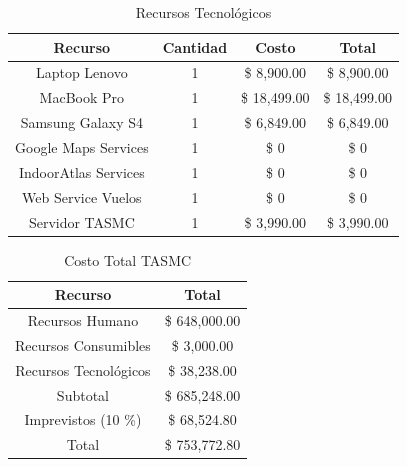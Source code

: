 \begin{table}[h] 
	\begin{center}
		\begin{tabular}{|c|c|c|c|}
			\hline \rowcolor[RGB]{51,153,255} 
			\textcolor{blanco}{\bf Recurso} &
				\textcolor{blanco}{\bf Cantidad} &
				\textcolor{blanco}{\bf Costo} &
				\textcolor{blanco}{\bf Total} \\
			\hline 
				Laptop Lenovo &
				1 &
				\$ 8,900.00 &
				\$ 8,900.00  \\
      		\hline \rowcolor[RGB]{240,248,255}
      			MacBook Pro &
				1 &
				\$ 18,499.00&
				\$ 18,499.00 \\
			\hline 
				Samsung Galaxy S4 &
				1 &
				\$ 6,849.00 &
				\$ 6,849.00  \\
      		\hline \rowcolor[RGB]{240,248,255}
      			Google Maps Services &
				1 &
				\$ 0 &
				\$ 0 \\
			\hline
				IndoorAtlas Services &
				1 &
				\$ 0 &
				\$ 0 \\
      		\hline \rowcolor[RGB]{240,248,255}
      			Web Service Vuelos &
				1 &
				\$ 0 &
				\$ 0 \\
			\hline
				Servidor TASMC &
				1 &
				\$ 3,990.00 &
				\$ 3,990.00 \\	
      		\hline 
    		\end{tabular}
	\end{center}
	\caption[Recursos Tecnológicos]{Recursos Tecnológicos} 
	\label{tab:recursosTecnologicos}
\end{table}

\begin{table} 
	\begin{center}
		\begin{tabular}{|c|c|}
			\hline \rowcolor[RGB]{51,153,255} 
			\textcolor{blanco}{\bf Recurso} &
				\textcolor{blanco}{\bf Total} \\
			\hline 
				Recursos Humano &
				\$ 648,000.00  \\
      		\hline \rowcolor[RGB]{240,248,255}
      			Recursos Consumibles &
				\$ 3,000.00  \\
			\hline 
				Recursos Tecnológicos &
				\$ 38,238.00  \\
      		\hline \rowcolor[RGB]{240,248,255}
      			Subtotal &
				\$ 685,248.00  \\
			\hline  
				Imprevistos (10 \%) &
				\$ 68,524.80  \\
      		\hline \rowcolor[RGB]{240,248,255}
      			Total &
				\$ 753,772.80 \\
      		\hline 
    		\end{tabular}
	\end{center}
	\caption[Costo Total TASMC]{Costo Total TASMC} 
	\label{tab:costoTasmc}
\end{table}
\vspace{3cm}
\newpage
